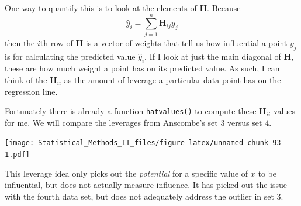\documentclass[]{book}
\newenvironment{Shaded}{\begin{snugshade}}{\end{snugshade}}
\newcommand{\KeywordTok}[1]{\textcolor[rgb]{0.13,0.29,0.53}{\textbf{{#1}}}}
\newcommand{\DataTypeTok}[1]{\textcolor[rgb]{0.13,0.29,0.53}{{#1}}}
\newcommand{\StringTok}[1]{\textcolor[rgb]{0.31,0.60,0.02}{{#1}}}
\newcommand{\CommentTok}[1]{\textcolor[rgb]{0.56,0.35,0.01}{\textit{{#1}}}}
\newcommand{\NormalTok}[1]{{#1}}
\theoremstyle{definition}
\theoremstyle{definition}
\theoremstyle{remark}
\begin{document}
One way to quantify this is to look at the elements of
\(\boldsymbol{H}\). Because
\[\hat{y}_{i}=\sum_{j=1}^{n}\boldsymbol{H}_{ij}y_{j}\] then the \(i\)th
row of \(\boldsymbol{H}\) is a vector of weights that tell us how
influential a point \(y_{j}\) is for calculating the predicted value
\(\hat{y}_{i}\). If I look at just the main diagonal of
\(\boldsymbol{H}\), these are how much weight a point has on its
predicted value. As such, I can think of the \(\boldsymbol{H}_{ii}\) as
the amount of leverage a particular data point has on the regression
line.

Fortunately there is already a function \texttt{hatvalues()} to compute
these \(\boldsymbol{H}_{ii}\) values for me. We will compare the
leverages from Anscombe's set 3 versus set 4.

\begin{Shaded}
\end{Shaded}

\texttt{[image: Statistical\_Methods\_II\_files/figure-latex/unnamed-chunk-93-1.pdf]}

This leverage idea only picks out the \emph{potential} for a specific
value of \(x\) to be influential, but does not actually measure
influence. It has picked out the issue with the fourth data set, but
does not adequately address the outlier in set 3.
\end{document}
